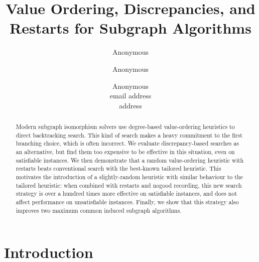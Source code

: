 \documentclass[letterpaper]{article} %
\title{Value Ordering, Discrepancies, and Restarts for Subgraph Algorithms}
\author{Anonymous \and Anonymous \and Anonymous \\ email address \\ address}
\begin{document}
\maketitle

\begin{abstract}
    Modern subgraph isomorphism solvers use degree-based value-ordering heuristics to direct
    backtracking search. This kind of search makes a heavy commitment to the first branching choice,
    which is often incorrect. We evaluate discrepancy-based searches as an alternative, but find
    them too expensive to be effective in this situation, even on satisfiable instances. We then
    demonstrate that a random value-ordering heuristic with restarts beats conventional search with
    the best-known tailored heuristic. This motivates the introduction of a slightly-random
    heuristic with similar behaviour to the tailored heuristic: when combined with restarts and
    nogood recording, this new search strategy is over a hundred times more effective on satisfiable
    instances, and does not affect performance on unsatisfiable instances.  Finally, we show that
    this strategy also improves two maximum common induced subgraph algorithms.
\end{abstract}

\section{Introduction}
\end{document}
